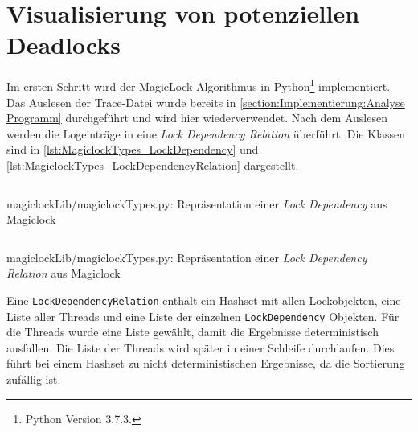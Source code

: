 \section{Visualisierung von potenziellen Deadlocks}
\label{section:Implementierung:Visualisierung von potenziellen Deadlocks}
Im ersten Schritt wird der MagicLock-Algorithmus in Python\footnote{Python
Version 3.7.3.} implementiert. Das Auslesen der Trace-Datei wurde bereits in
\cref{section:Implementierung:Analyse Programm} durchgeführt und wird hier
wiederverwendet. Nach dem Auslesen werden die Logeinträge in eine \textit{Lock
Dependency Relation} überführt. Die Klassen sind in
\cref{lst:MagiclockTypes_LockDependency} und
\cref{lst:MagiclockTypes_LockDependencyRelation} dargestellt.
\begin{listing}[ht]
  \inputminted[frame=lines,linenos,firstline=45,lastline=49]{python}{./Python/magiclockLib/magiclockTypes.py}
  \caption{magiclockLib/magiclockTypes.py: Repräsentation einer \textit{Lock Dependency} aus Magiclock\autocite[3]{MagicLock}}
  \label{lst:MagiclockTypes_LockDependency}
\end{listing}
\begin{listing}[ht]
  \inputminted[frame=lines,linenos,firstline=67,lastline=77]{python}{./Python/magiclockLib/magiclockTypes.py}
  \caption{magiclockLib/magiclockTypes.py: Repräsentation einer \textit{Lock Dependency Relation} aus Magiclock\autocite[3]{MagicLock}}
  \label{lst:MagiclockTypes_LockDependencyRelation}
\end{listing}
Eine \texttt{LockDependencyRelation} enthält ein Hashset mit allen Lockobjekten,
eine Liste aller Threads und eine Liste der einzelnen \texttt{LockDependency}
Objekten. Für die Threads wurde eine Liste gewählt, damit die Ergebnisse
deterministisch ausfallen. Die Liste der Threads wird später in einer Schleife
durchlaufen. Dies führt bei einem Hashset zu nicht deterministischen Ergebnisse,
da die Sortierung zufällig ist.

